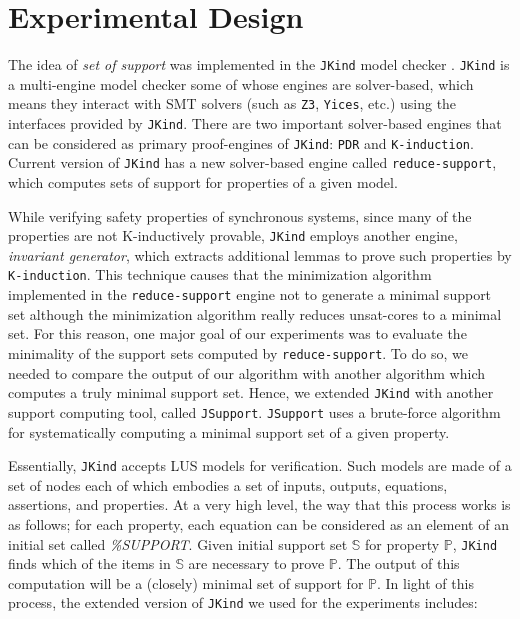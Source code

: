 \section{Experimental Design}
\label{sec:exprm}
The idea of \emph{set of support} \cite{setofsupp} was implemented in the \texttt{JKind} model checker \cite{jkind}.
\texttt{JKind} is a multi-engine model checker some of whose engines are solver-based,
which means they interact with SMT solvers (such as \texttt{Z3}, \texttt{Yices}, etc.) using the interfaces provided by \texttt{JKind}. There are two important solver-based engines that can be considered as primary proof-engines of \texttt{JKind}: \texttt{PDR} and \texttt{K-induction}. Current version of \texttt{JKind} has a new solver-based engine called \texttt{reduce-support}, which computes sets of support for properties of a given model.

While verifying safety properties of synchronous systems, since many of the properties are not K-inductively provable, \texttt{JKind} employs another engine, \emph{invariant generator},
which extracts additional lemmas to prove such properties by \texttt{K-induction}.
This technique causes that the minimization algorithm implemented in the \texttt{reduce-support} engine not to generate a minimal support set although the minimization algorithm really reduces unsat-cores to a minimal set.
For this reason,
one major goal of our experiments was to evaluate the minimality of the support sets computed by \texttt{reduce-support}.
To do so, we needed to compare the output of our algorithm with another algorithm
which computes a truly minimal support set. Hence, we extended \texttt{JKind}
with another support computing tool, called \texttt{JSupport}. \texttt{JSupport} uses a brute-force algorithm for systematically computing a minimal support set of a given property.

 Essentially, \texttt{JKind} accepts LUS models for verification.
 Such models are made of a set of nodes each of which embodies a set of inputs, outputs, equations, assertions, and properties. At a very high level, the way that this process works is as follows; for each property, each equation can be considered as an element of an initial set called \textit{\%SUPPORT}. Given initial support set $\mathbb{S}$ for property $\mathbb{P}$, \texttt{JKind} finds which of the items in $\mathbb{S}$ are necessary to prove $\mathbb{P}$. The output of this computation will be a (closely) minimal set of support for $\mathbb{P}$. In light of this process, the extended version of \texttt{JKind} we used for the experiments includes:

